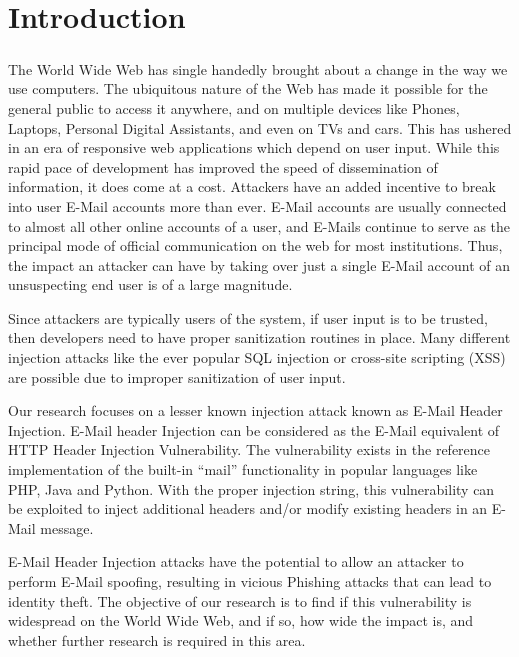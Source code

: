 \chapter{Introduction}
\paragraph{}
	The World Wide Web has single handedly brought about a change in the way we use computers. The ubiquitous nature of the Web has made it possible for the general public to access it anywhere, and on multiple devices like Phones, Laptops, Personal Digital Assistants, and even on TVs and cars. This has ushered in an era of responsive web applications which depend on user input. While this rapid pace of development has improved the speed of dissemination of information, it does come at a cost. Attackers have an added incentive to break into user E-Mail accounts more than ever. E-Mail accounts are usually connected to almost all other online accounts of a user, and E-Mails continue to serve as the principal mode of official communication on the web for most institutions. Thus, the impact an attacker can have by taking over just a single E-Mail account of an unsuspecting end user is of a large magnitude. 
	
	Since attackers are typically users of the system, if user input is to be trusted, then developers need to have proper sanitization routines in place. Many different injection attacks like the ever popular SQL injection or cross-site scripting (XSS) \cite{OWASPT10} are possible due to improper sanitization of user input. 
	
	Our research focuses on a lesser known injection attack known as E-Mail Header Injection. E-Mail header Injection can be considered as the E-Mail equivalent of HTTP Header Injection Vulnerability. The vulnerability exists in the reference implementation of the built-in “mail” functionality in popular languages like PHP, Java and Python. With the proper injection string, this vulnerability can be exploited to inject additional headers and/or modify existing headers in an E-Mail message.

	E-Mail Header Injection attacks have the potential to allow an attacker to perform E-Mail spoofing, resulting in vicious Phishing attacks that can lead to identity theft.
	The objective of our research is to find if this vulnerability is widespread on the World Wide Web, and if so, how wide the impact is, and whether further research is required in this area.
	

